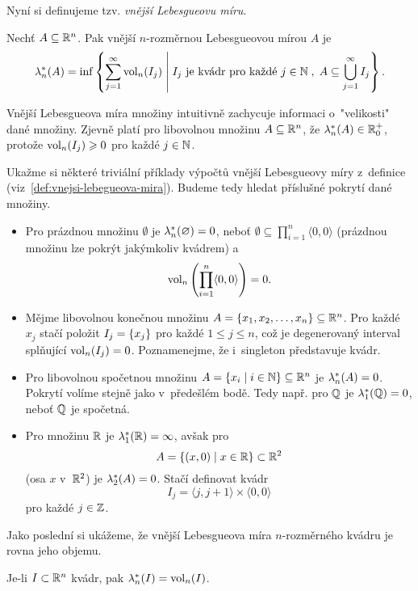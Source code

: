 Nyní si definujeme tzv. \emph{vnější Lebesgueovu míru}.
\begin{definition}\label{def:vnejsi-lebegueova-mira}
    Nechť $A\subseteq\mathbb{R}^n$. Pak vnější $n$-rozměr\-nou Lebesgueovou mírou $A$ je
    \[\lambda_n^*(A)=\inf\left\{\sum_{j=1}^{\infty}\operatorname{vol}_n(I_j)\;\middle|\;\text{$I_j$ je kvádr pro každé $j\in\mathbb{N}$}\;,\;A\subseteq\bigcup_{j=1}^\infty I_j\right\}.\]
\end{definition}
Vnější Lebesgueova míra množiny intuitivně zachycuje informaci o~"velikosti" dané množiny. Zjevně platí pro libovolnou množinu $A\subseteq\mathbb{R}^n$, že $\lambda_n^*(A)\in\mathbb{R}_0^+$, protože $\operatorname{vol}_n(I_j)\geqslant0$ pro každé $j\in\mathbb{N}$.
\begin{example}\label{ex:lebegueova-mira-trivialni-priklady}
    Ukažme si některé triviální příklady výpočtů vnější Lebesgueovy míry z~definice (viz~\ref{def:vnejsi-lebegueova-mira}). Budeme tedy hledat příslušné pokrytí dané množiny.
    \begin{itemize}
        \item Pro prázdnou množinu $\emptyset$ je $\lambda_n^*(\varnothing)=0$, neboť $\emptyset\subseteq\prod_{i=1}^{n}\langle0,0\rangle$ (prázdnou množinu lze pokrýt jakýmkoliv kvádrem) a
        \[\operatorname{vol}_n\left(\prod_{i=1}^{n}\langle0,0\rangle\right)=0.\]
        \item Mějme libovolnou konečnou množinu $A=\left\{x_1,x_2,\dots,x_n\right\}\subseteq\mathbb{R}^n$. Pro každé $x_j$ stačí položit $I_j=\left\{x_j\right\}$ pro každé $1\leqslant j\leqslant n$, což je degenerovaný interval splňující $\operatorname{vol}_n(I_j)=0$. Poznamenejme, že i~singleton představuje kvádr.
        \item Pro libovolnou spočetnou množinu $A=\left\{x_i\mid i\in\mathbb{N}\right\}\subseteq\mathbb{R}^n$ je $\lambda_n^*(A)=0$. Pokrytí volíme stejně jako v~předešlém bodě. Tedy např. pro $\mathbb{Q}$ je $\lambda_1^*(\mathbb{Q})=0$, neboť $\mathbb{Q}$ je spočetná.
        \item Pro množinu $\mathbb{R}$ je $\lambda_1^*(\mathbb{R})=\infty$, avšak pro 
        \[A=\left\{(x,0)\mid x\in\mathbb{R}\right\}\subset\mathbb{R}^2\]
        (osa $x$ v~$\mathbb{R}^2$) je $\lambda_2^*(A)=0$. Stačí definovat kvádr
        \[I_j=\langle j,j+1\rangle\times\langle 0,0\rangle\]
        pro každé $j\in\mathbb{Z}$.
    \end{itemize}
\end{example}
Jako poslední si ukážeme, že vnější Lebesgueova míra $n$-rozměrného kvádru je rovna jeho objemu.
\begin{proposition}\label{prop:lebegueova-mira-objem-kvadru}
    Je-li $I\subset\mathbb{R}^n$ kvádr, pak $\lambda_n^*(I)=\operatorname{vol}_n(I)$.
\end{proposition}
